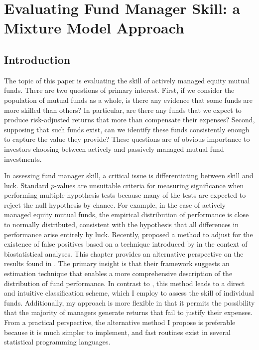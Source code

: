 \chapter{Evaluating Fund Manager Skill: a Mixture Model Approach}
\label{chapter:two}

\section{Introduction}
	The topic of this paper is evaluating the skill of actively managed equity mutual funds.  There are two questions of primary interest.  First, if we consider the population of mutual funds as a whole, is there any evidence that some funds are more skilled than others?  In particular, are there any funds that we expect to produce risk-adjusted returns that more than compensate their expenses?  Second, supposing that such funds exist, can we identify these funds consistently enough to capture the value they provide?  These questions are of obvious importance to investors choosing between actively and passively managed mutual fund investments.

	In assessing fund manager skill, a critical issue is differentiating between skill and luck. Standard $p$-values are unsuitable criteria for measuring significance when performing multiple hypothesis tests because many of the tests are expected to reject the null hypothesis by chance.  For example, in the case of actively managed equity mutual funds, the empirical distribution of performance is close to normally distributed, consistent with the hypothesis that all differences in performance arise entirely by luck. Recently, \citet{Barras2010} proposed a method to adjust for the existence of false positives based on a technique introduced by \citet{Storey2002} in the context of biostatistical analyses. This chapter provides an alternative perspective on the results found in \citet{Barras2010}. The primary insight is that their framework suggests an estimation technique that enables a more comprehensive description of the distribution of fund performance. In contrast to \citet{Barras2010}, this method leads to a direct and intuitive classification scheme, which I employ to assess the skill of individual funds.  Additionally, my approach is more flexible in that it permits the possibility that the majority of managers generate returns that fail to justify their expenses. From a practical perspective, the alternative method I propose is preferable because it is much simpler to implement, and fast routines exist in several statistical programming languages.

